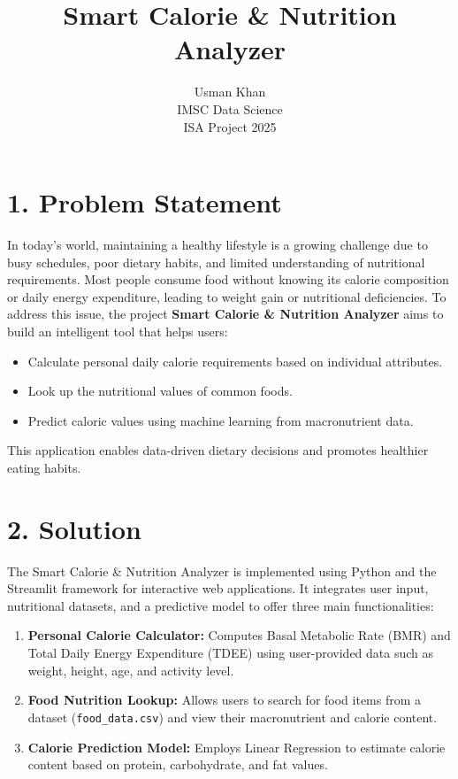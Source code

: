\documentclass[12pt,a4paper]{article}
\title{\textbf{Smart Calorie \& Nutrition Analyzer}}
\author{Usman Khan \\ IMSC Data Science \\ ISA Project 2025}
\date{}
\begin{document}
\maketitle

\section*{1. Problem Statement}
In today's world, maintaining a healthy lifestyle is a growing challenge due to busy schedules, poor dietary habits, and limited understanding of nutritional requirements. 
Most people consume food without knowing its calorie composition or daily energy expenditure, leading to weight gain or nutritional deficiencies.  
To address this issue, the project \textbf{Smart Calorie \& Nutrition Analyzer} aims to build an intelligent tool that helps users:
\begin{itemize}
    \item Calculate personal daily calorie requirements based on individual attributes.
    \item Look up the nutritional values of common foods.
    \item Predict caloric values using machine learning from macronutrient data.
\end{itemize}
This application enables data-driven dietary decisions and promotes healthier eating habits.

\section*{2. Solution}
The Smart Calorie \& Nutrition Analyzer is implemented using Python and the Streamlit framework for interactive web applications. 
It integrates user input, nutritional datasets, and a predictive model to offer three main functionalities:

\begin{enumerate}
    \item \textbf{Personal Calorie Calculator:} Computes Basal Metabolic Rate (BMR) and Total Daily Energy Expenditure (TDEE) using user-provided data such as weight, height, age, and activity level.
    \item \textbf{Food Nutrition Lookup:} Allows users to search for food items from a dataset (\texttt{food\_data.csv}) and view their macronutrient and calorie content.
    \item \textbf{Calorie Prediction Model:} Employs Linear Regression to estimate calorie content based on protein, carbohydrate, and fat values.
\end{enumerate}
\end{document}
